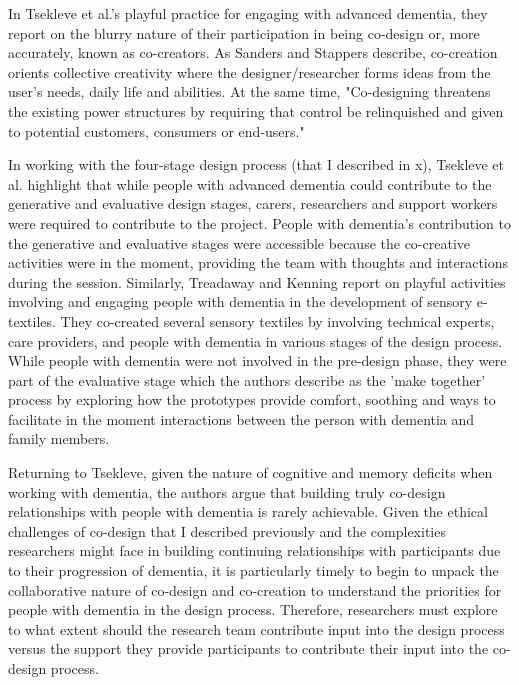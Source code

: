 In Tsekleve et al.'s playful practice for engaging with advanced dementia, they report on the blurry nature of their participation in being co-design or, more accurately, known as co-creators. As Sanders and Stappers describe, co-creation orients collective creativity where the designer/researcher forms ideas from the user's needs, daily life and abilities. At the same time, "Co-designing threatens the existing power structures by requiring that control be relinquished and given to potential customers, consumers or end-users."

 In working with the four-stage design process (that I described in x), Tsekleve et al. highlight that while people with advanced dementia could contribute to the generative and evaluative design stages, carers, researchers and support workers were required to contribute to the project. People with dementia's contribution to the generative and evaluative stages were accessible because the co-creative activities were in the moment, providing the team with thoughts and interactions during the session. Similarly, Treadaway and Kenning report on playful activities involving and engaging people with dementia in the development of sensory e-textiles. They co-created several sensory textiles by involving technical experts, care providers, and people with dementia in various stages of the design process. While people with dementia were not involved in the pre-design phase, they were part of the evaluative stage which the authors describe as the 'make together' process by exploring how the prototypes provide comfort, soothing and ways to facilitate in the moment interactions between the person with dementia and family members.

Returning to Tsekleve, given the nature of cognitive and memory deficits when working with dementia, the authors argue that building truly co-design relationships with people with dementia is rarely achievable. Given the ethical challenges of co-design that I described previously and the complexities researchers might face in building continuing relationships with participants due to their progression of dementia, it is particularly timely to begin to unpack the collaborative nature of co-design and co-creation to understand the priorities for people with dementia in the design process. Therefore, researchers must explore to what extent should the research team contribute input into the design process versus the support they provide participants to contribute their input into the co-design process.


